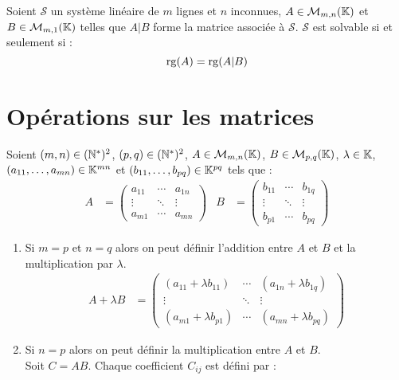 \begin{theorem}
    Soient $\mathcal{S}$ un système linéaire de $m$ lignes et $n$ inconnues, $A \in \mathcal{M}_{m,n}(\mathbb{K})$ et $B \in \mathcal{M}_{m,1}(\mathbb{K})$ telles que $A|B$ forme la matrice associée à $\mathcal{S}$. $\mathcal{S}$ est solvable si et seulement si :
    \[ \operatorname{rg}(A) = \operatorname{rg}(A|B) \]
\end{theorem}

\section{Opérations sur les matrices}
\begin{definition}
	Soient $(m,n) \in (\mathbb{N}^*)^2$, $(p,q) \in (\mathbb{N}^*)^2$, $A \in \mathcal{M}_{m, n}(\mathbb{K})$, $B \in \mathcal{M}_{p, q}(\mathbb{K})$, $\lambda \in \mathbb{K}$, $(a_{11}, \ldots, a_{mn}) \in \mathbb{K}^{mn}$ et $(b_{11}, \ldots, b_{pq}) \in \mathbb{K}^{pq}$ tels que :
	\begin{align*}
		A &=
		\begin{pmatrix}
			a_{11} & \cdots & a_{1n} \\
			\vdots & \ddots & \vdots \\
			a_{m1} & \cdots & a_{mn}
		\end{pmatrix}
		&
		B &= 
		\begin{pmatrix}
			b_{11} & \cdots & b_{1q} \\
			\vdots & \ddots & \vdots \\
			b_{p1} & \cdots & b_{pq}
		\end{pmatrix}
	\end{align*}
	\begin{enumerate}
		\item Si $m = p$ et $n = q$ alors on peut définir l'addition entre $A$ et $ B$ et la multiplication par $\lambda$.
		\begin{align*}
			A + \lambda B &= 
			\begin{pmatrix}
				(a_{11} + \lambda b_{11}) & \cdots & (a_{1n} + \lambda b_{1q}) \\
				\vdots & \ddots & \vdots \\
				(a_{m1} + \lambda b_{p1}) & \cdots & (a_{mn} + \lambda b_{pq})
			\end{pmatrix}
		\end{align*}
		\item Si $n = p$ alors on peut définir la multiplication entre $A$ et $B$.\\
		Soit $C = AB$. Chaque coefficient $C_{ij}$ est défini par :
		\begin{align*}

\end{align*}
\end{enumerate}
\end{definition}
